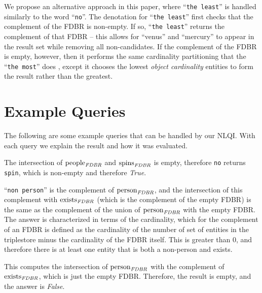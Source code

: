 \documentclass[../main.tex]{subfiles}
\begin{document}
\begin{refsection}
We propose an alternative approach in this paper, where ``\texttt{the least}'' is handled similarly to the word ``\texttt{no}''.  The denotation for ``\texttt{the least}'' first checks that the complement of the FDBR is non-empty.  If so, ``\texttt{the least}'' returns the complement of that FDBR -- this allows for ``venus'' and ``mercury'' to appear in the result set while removing all non-candidates.  If the complement of the FDBR is empty, however, then it performs the same cardinality partitioning that the ``\texttt{the most}'' does \cite{frostpeelar2019}, except it chooses the lowest {\em object cardinality} entities to form the result rather than the greatest.

\section{Example Queries}
\label{webist2020conf:examples}
\noindent The following are some example queries that can be handled by our NLQI.  With each query
we explain the result and how it was evaluated.

\examplespacing


\examplespacing

\noindent The intersection of $\operatorname{people}_{\operatorname{\mathit{FDBR}}}$ and $\operatorname{spins}_{\operatorname{\mathit{FDBR}}}$ is empty, therefore \texttt{no} returns \texttt{spin}, which is non-empty and therefore \textit{True}.


\examplespacing

\noindent ``\texttt{non person}'' is the complement of $\operatorname{person}_{\operatorname{\mathit{FDBR}}}$, and the intersection of this complement with $\operatorname{exists}_{\operatorname{\mathit{FDBR}}}$ (which is the complement of the empty FDBR) is the same as the complement of the union of $\operatorname{person}_{\operatorname{\mathit{FDBR}}}$ with the empty FDBR.  The answer is characterized in terms of the cardinality, which for the complement of an FDBR is defined as the cardinality of the number of set of entities in the triplestore minus the cardinality of the FDBR itself.  This is greater than 0, and therefore there is at least one entity that is both a non-person and exists.

\examplespacing


\examplespacing

\noindent This computes the intersection of $\operatorname{person}_{\operatorname{\mathit{FDBR}}}$ with the complement of $\operatorname{exists}_{\operatorname{\mathit{FDBR}}}$, which is just the empty FDBR.  Therefore, the result is empty, and the answer is \textit{False}.


\end{refsection}
\end{document}
